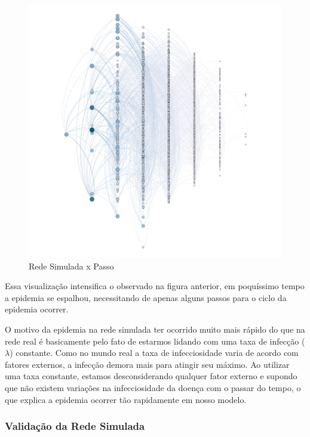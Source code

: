 \documentclass[a4paper,12pt]{article}
\begin{document}
\begin{figure}[h]
 \centering
 \includegraphics[scale=0.4]{../results/Untitled.png}
 \caption{Rede Simulada x Passo}
\end{figure}

\pagebreak
Essa visualização intensifica o observado na figura anterior, em poquíssimo tempo a epidemia se espalhou, necessitando de apenas alguns passos
para o ciclo da epidemia ocorrer. 

O motivo da epidemia na rede simulada ter ocorrido muito mais rápido do que na rede real é basicamente pelo fato de estarmos lidando com uma
taxa de infecção ($\lambda$) constante. Como no mundo real a taxa de infecciosidade varia de acordo com fatores externos, a infecção demora mais
para atingir seu máximo. Ao utilizar uma taxa constante, estamos desconsiderando qualquer fator externo e supondo que não existem
variações na infecciosidade da doença com o  passar do tempo, o que explica a epidemia ocorrer tão rapidamente em nosso modelo.

\pagebreak
\subsubsection{Validação da Rede Simulada}
\end{document}
